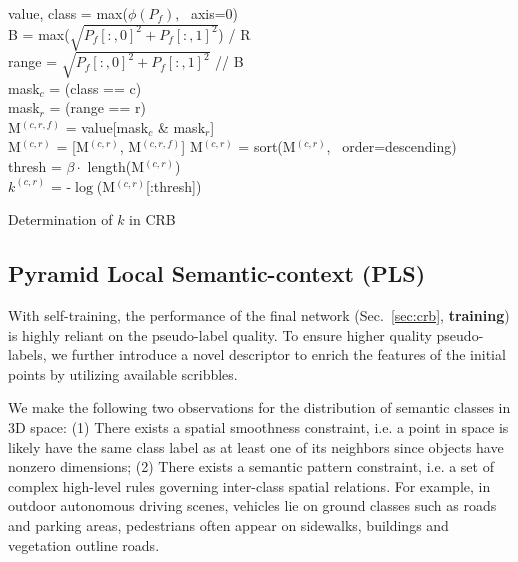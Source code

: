 \documentclass[10pt,twocolumn,letterpaper]{article}
\begin{document}
\begin{algorithm}[t]
\DontPrintSemicolon

 {
    value, class = max($\phi(P_f)$, \ axis=0) \\
    B = max($\sqrt{P_f[:,0]^2 + P_f[:,1]^2}$) / R \\
    range = $\sqrt{P_f[:,0]^2 + P_f[:,1]^2}$ // B \\
     {
        mask$_c$ = (class == c) \\
         {
            mask$_r$ = (range == r) \\
            M$^{(c,r,f)}$ = value[mask$_c$ \& mask$_r$] \\
            M$^{(c,r)}$ = [M$^{(c,r)}$, M$^{(c,r,f)}$]
        }
    }
}
 {
     {
        M$^{(c,r)}$ = sort(M$^{(c,r)}$, \ order=descending) \\
        thresh = $\beta \cdot$ length(M$^{(c,r)}$) \\
        $k^{(c,r)}$ = -$\log$(M$^{(c,r)}$[:thresh])
    }
}
\caption{Determination of $k$ in CRB}
\label{alg:cbr}
\end{algorithm}

\subsection{Pyramid Local Semantic-context (PLS)} \label{sec:pls}

With self-training, the performance of the final network (Sec.~\ref{sec:crb}, \textbf{training}) is highly reliant on the pseudo-label quality. To ensure higher quality pseudo-labels, we further introduce a novel descriptor to enrich the features of the initial points by utilizing available scribbles.

We make the following two observations for the distribution of semantic classes in 3D space: (1) There exists a spatial smoothness constraint, i.e. a point in space is likely have the same class label as at least one of its neighbors since objects have nonzero dimensions; (2) There exists a semantic pattern constraint, i.e. a set of complex high-level rules governing inter-class spatial relations. For example, in outdoor autonomous driving scenes, vehicles lie on ground classes such as roads and parking areas, pedestrians often appear on sidewalks, buildings and vegetation outline roads.
\end{document}
